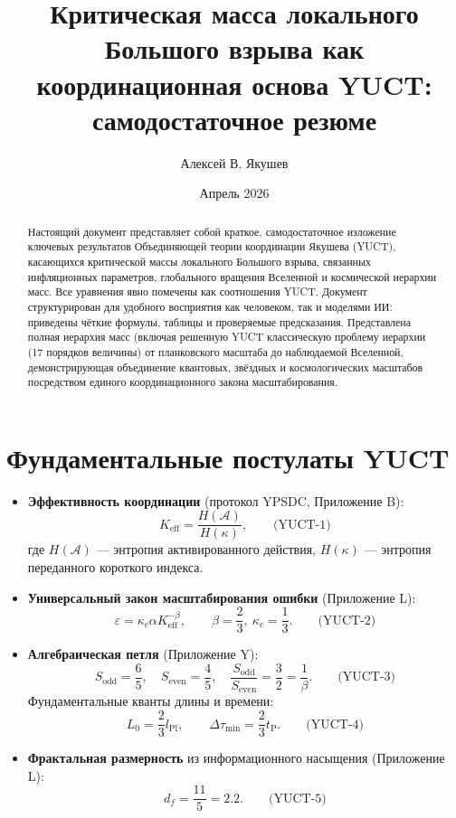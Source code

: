\documentclass[12pt,a4paper]{article}
\title{\textbf{Критическая масса локального Большого взрыва как координационная основа YUCT: самодостаточное резюме}}
\author{Алексей В. Якушев}
\date{Апрель 2026}
\newcommand{\kappac}{\kappa_c}
\newcommand{\Keff}{K_{\mathrm{eff}}}
\newcommand{\betaf}{\beta}
\newcommand{\Lpl}{l_{\mathrm{Pl}}}
\newcommand{\tP}{t_{\mathrm{P}}}
\newcommand{\Sodd}{S_{\mathrm{odd}}}
\newcommand{\Seven}{S_{\mathrm{even}}}
\newcommand{\Dtau}{\Delta\tau_{\min}}
\newcommand{\Lzero}{L_0}
\begin{document}
	
	\maketitle
	
	\begin{abstract}
		Настоящий документ представляет собой краткое, самодостаточное изложение ключевых результатов Объединяющей теории координации Якушева (YUCT), касающихся критической массы локального Большого взрыва, связанных инфляционных параметров, глобального вращения Вселенной и космической иерархии масс. Все уравнения явно помечены как соотношения YUCT. Документ структурирован для удобного восприятия как человеком, так и моделями ИИ: приведены чёткие формулы, таблицы и проверяемые предсказания. Представлена полная иерархия масс (включая решенную YUCT классическую проблему иерархии (17 порядков величины) от планковского масштаба до наблюдаемой Вселенной, демонстрирующая объединение квантовых, звёздных и космологических масштабов посредством единого координационного закона масштабирования.
	\end{abstract}
	
	\section{Фундаментальные постулаты YUCT}
	
	\begin{itemize}
		\item \textbf{Эффективность координации} (протокол YPSDC, Приложение B):
		\[
		\Keff = \frac{H(\mathcal{A})}{H(\kappa)}, \qquad\text{(YUCT-1)}
		\]
		где \(H(\mathcal{A})\) — энтропия активированного действия, \(H(\kappa)\) — энтропия переданного короткого индекса.
		
		\item \textbf{Универсальный закон масштабирования ошибки} (Приложение L):
		\[
		\varepsilon = \kappac \alpha \Keff^{-\betaf}, \qquad \betaf = \frac{2}{3},\ \kappac = \frac{1}{3}. \qquad\text{(YUCT-2)}
		\]
		
		\item \textbf{Алгебраическая петля} (Приложение Y):
		\[
		\Sodd = \frac{6}{5},\quad \Seven = \frac{4}{5},\quad \frac{\Sodd}{\Seven} = \frac{3}{2} = \frac{1}{\betaf}. \qquad\text{(YUCT-3)}
		\]
		Фундаментальные кванты длины и времени:
		\[
		\Lzero = \frac{2}{3}\Lpl,\qquad \Dtau = \frac{2}{3}\tP. \qquad\text{(YUCT-4)}
		\]
		
		\item \textbf{Фрактальная размерность} из информационного насыщения (Приложение L):
		\[
		d_f = \frac{11}{5}=2.2. \qquad\text{(YUCT-5)}
		\]
	\end{itemize}
	
\end{document}
